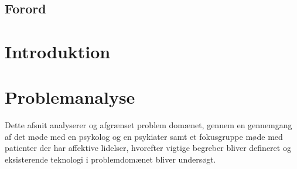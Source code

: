%
%
%
%
% 



\pagestyle{empty} %
%
%

\cleardoublepage

\section*{Forord}

\cleardoublepage

\pagestyle{fancy} %
\setcounter{tocdepth}{1}
\tableofcontents
\listoftodos
%
\cleardoublepage

\chapter*{Introduktion}


\chapter{Problemanalyse}
Dette afsnit analyserer og afgrænset problem domænet, gennem en gennemgang af det møde med en psykolog og en psykiater samt et fokusgruppe møde med patienter der har affektive lidelser, hvorefter vigtige begreber bliver defineret og eksisterende teknologi i problemdomænet bliver undersøgt.




